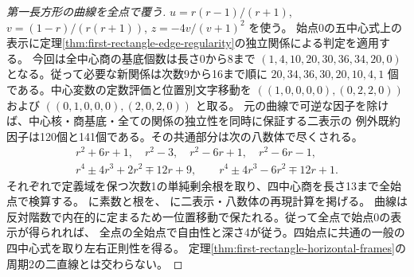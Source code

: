 \begin{proof}[第一長方形の曲線を全点で覆う]
$u=r(r-1)/(r+1)$, $v=(1-r)/(r(r+1))$, $z=-4v/(v+1)^2$ を使う。
始点0の五中心式上の表示に定理\ref{thm:first-rectangle-edge-regularity}の独立関係による判定を適用する。
今回は全中心商の基底個数は長さ0から8まで
$(1,4,10,20,30,36,34,20,0)$ となる。従って必要な新関係は次数9から16まで順に
$20,34,36,30,20,10,4,1$ 個である。中心変数の定数評価と位置別文字移動を
$((1,0,0,0,0),(0,2,2,0))$ および $((0,1,0,0,0),(2,0,2,0))$ と取る。
元の曲線で可逆な因子を除けば、中心核・商基底・全ての関係の独立性を同時に保証する二表示の
例外既約因子は120個と141個である。その共通部分は次の八数体で尽くされる。
\[
\begin{gathered}
r^2+6r+1,\quad r^2-3,\quad r^2-6r+1,\quad r^2-6r-1,\\
r^4\pm4r^3+2r^2\mp12r+9,\qquad
r^4\pm4r^3-6r^2\mp12r+1 .
\end{gathered}
\]
それぞれで定義域を保つ次数1の単純剰余根を取り、四中心商を長さ13まで全始点で検算する。
 に素数と根を、
 に二表示・八数体の再現計算を掲げる。
曲線は反対階数で内在的に定まるため一位置移動で保たれる。従って全点で始点0の表示が得られれば、
全点の全始点で自由性と深さ4が従う。四始点に共通の一般の四中心式を取り左右正則性を得る。
定理\ref{thm:first-rectangle-horizontal-frames}の周期2の二直線とは交わらない。
\end{proof}
